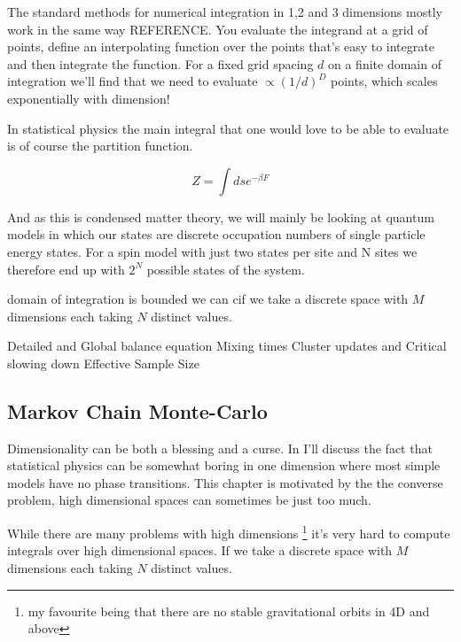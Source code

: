 The standard methods for numerical integration in 1,2 and 3 dimensions mostly work in the same way REFERENCE. You evaluate the integrand at a grid of points, define an interpolating function over the points that's easy to integrate and then integrate the function. For a fixed grid spacing \(d\) on a finite domain of integration we'll find that we need to evaluate \(\propto (1/d)^D\) points, which scales exponentially with dimension!

In statistical physics the main integral that one would love to be able to evaluate is of course the partition function.

\[Z = \int ds e^{-\beta F}\]

And as this is condensed matter theory, we will mainly be looking at quantum models in which our states are discrete occupation numbers of single particle energy states. For a spin model with just two states per site and N sites we therefore end up with \(2^N\) possible states of the system.

domain of integration is bounded we can cif we take a discrete space with \(M\) dimensions each taking \(N\) distinct values.

Detailed and Global balance equation Mixing times Cluster updates and Critical slowing down Effective Sample Size


\hypertarget{markov-chain-monte-carlo-2}{%
\subsection{Markov Chain Monte-Carlo}\label{markov-chain-monte-carlo-2}}

Dimensionality can be both a blessing and a curse. In I'll discuss the fact that statistical physics can be somewhat boring in one dimension where most simple models have no phase transitions. This chapter is motivated by the the converse problem, high dimensional spaces can sometimes be just too much.

While there are many problems with high dimensions \footnote{my favourite being that there are no stable gravitational orbits in 4D and above} it's very hard to compute integrals over high dimensional spaces. If we take a discrete space with \(M\) dimensions each taking \(N\) distinct values.

